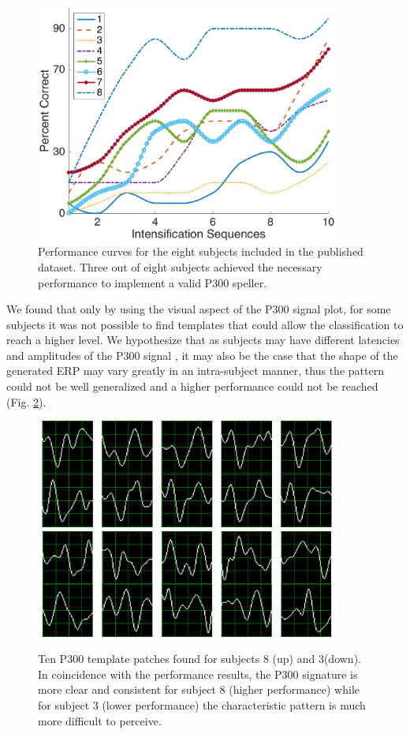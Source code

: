 \documentclass[entropy,article,submit,moreauthors,pdftex,10pt,a4paper]{mdpi}
\begin{document}
\begin{figure}[H]
\centering
\includegraphics[width=10cm]{performance.eps}
\caption{Performance curves for the eight subjects included in the published dataset.  Three out of eight subjects achieved the necessary performance to implement a valid P300 speller.}
\label{fig:performance}
\end{figure}

We found that only by using the visual aspect of the P300 signal plot,  for some subjects it was not possible to find templates that could allow the classification to reach a higher level.  We hypothesize that as subjects may have different latencies and amplitudes of the P300 signal \citep{Riccio2013}, it may also be the case that the shape of the generated ERP may vary greatly in an intra-subject manner, thus the pattern could not be well generalized and a higher performance could not be reached (Fig.  \ref{fig:p300templates}).

\begin{figure}[H]
\centering
\includegraphics[width=10cm]{subject8.png}
\includegraphics[width=10cm]{subject3.png}
\caption{Ten P300 template patches found for subjects 8 (up) and 3(down).  In coincidence with the performance results, the P300 signature is more clear and consistent for subject 8 (higher performance) while for subject 3 (lower performance) the characteristic pattern is much more difficult to perceive.}
\label{fig:p300templates}
\end{figure}
\end{document}
